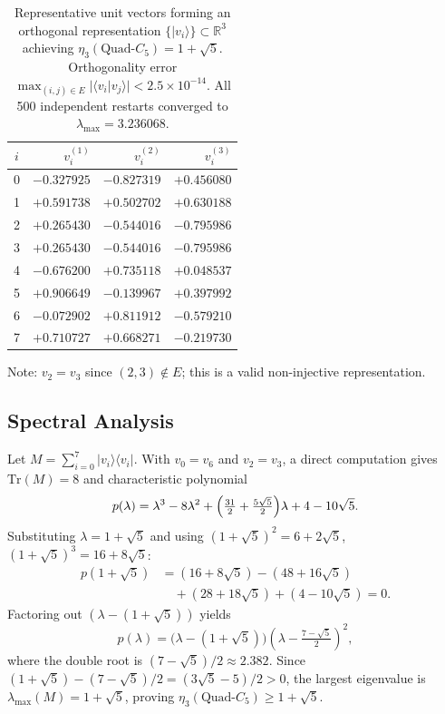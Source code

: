 \documentclass[aps,pra,twocolumn,superscriptaddress,longbibliography,floatfix]{revtex4-2}
\newcommand{\lmax}{\lambda_{\max}}
\newcommand{\QC}{\ensuremath{\text{Quad-}C_5}}
\begin{document}
\begin{table}[h]
  \caption{Representative unit vectors forming an orthogonal representation
           $\{|v_i\rangle\}\subset\mathbb{R}^3$ achieving $\eta_3(\QC)=1+\sqrt{5}$.
           Orthogonality error $\max_{(i,j)\in E}|\langle v_i|v_j\rangle|<2.5\times10^{-14}$.
           All 500 independent restarts converged to $\lmax=3.236068$.}
  \label{tab:unit_vecs}
  \begin{ruledtabular}
  \begin{tabular}{crrr}
    $i$ & $v_i^{(1)}$ & $v_i^{(2)}$ & $v_i^{(3)}$ \\
    \hline
    0 & $-0.327925$ & $-0.827319$ & $+0.456080$ \\
    1 & $+0.591738$ & $+0.502702$ & $+0.630188$ \\
    2 & $+0.265430$ & $-0.544016$ & $-0.795986$ \\
    3 & $+0.265430$ & $-0.544016$ & $-0.795986$ \\
    4 & $-0.676200$ & $+0.735118$ & $+0.048537$ \\
    5 & $+0.906649$ & $-0.139967$ & $+0.397992$ \\
    6 & $-0.072902$ & $+0.811912$ & $-0.579210$ \\
    7 & $+0.710727$ & $+0.668271$ & $-0.219730$ \\
  \end{tabular}
  \end{ruledtabular}
  \noindent Note: $v_2=v_3$ since $(2,3)\notin E$; this is a valid non-injective representation.
\end{table}

\subsection{Spectral Analysis}

Let $M=\sum_{i=0}^{7}|v_i\rangle\langle v_i|$.
With $v_0=v_6$ and $v_2=v_3$, a direct computation gives
$\mathrm{Tr}(M)=8$ and characteristic polynomial
\begin{equation}
  p(\lambda) = \lambda^3 - 8\lambda^2
    + \Bigl(\tfrac{31}{2}+\tfrac{5\sqrt{5}}{2}\Bigr)\lambda
    + 4-10\sqrt{5}.
\end{equation}
Substituting $\lambda=1+\sqrt{5}$ and using $(1+\sqrt{5})^2=6+2\sqrt{5}$,
$(1+\sqrt{5})^3=16+8\sqrt{5}$:
\begin{align}
p(1+\sqrt{5}) &= (16+8\sqrt{5}) - (48+16\sqrt{5})\nonumber\\
             &\quad+ (28+18\sqrt{5}) + (4-10\sqrt{5}) = 0.\nonumber
\end{align}
Factoring out $(\lambda-(1+\sqrt{5}))$ yields
\begin{equation}
  p(\lambda) = \bigl(\lambda-(1+\sqrt{5})\bigr)
               \!\left(\lambda-\tfrac{7-\sqrt{5}}{2}\right)^{\!2},
  \label{eq:charpoly_app}
\end{equation}
where the double root is $(7-\sqrt{5})/2\approx2.382$.
Since $(1+\sqrt{5})-(7-\sqrt{5})/2=(3\sqrt{5}-5)/2>0$, the largest
eigenvalue is $\lambda_{\max}(M)=1+\sqrt{5}$, proving $\eta_3(\QC)\geq 1+\sqrt{5}$.
\end{document}
